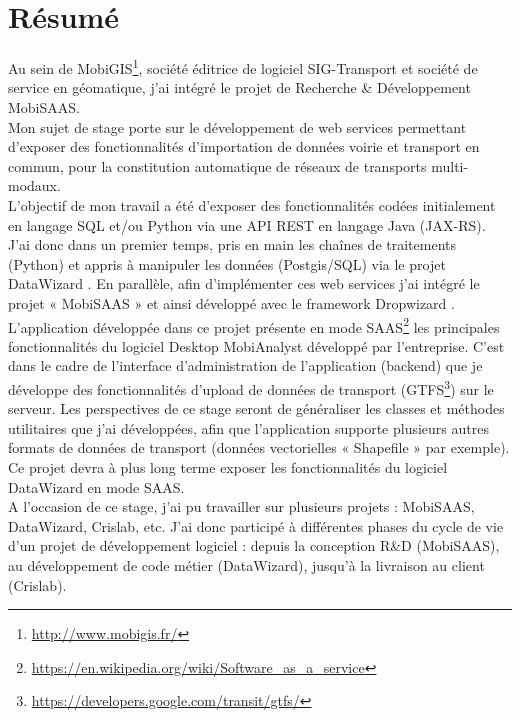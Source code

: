 \chapter*{Résumé}\label{Resume}

Au sein de MobiGIS\footnote{\url{http://www.mobigis.fr/}}, société éditrice de logiciel SIG-Transport et société de service en géomatique, j'ai intégré le projet de Recherche \& Développement \og MobiSAAS\fg.\\

Mon sujet de stage porte sur le développement de web services permettant d'exposer des fonctionnalités d'importation de données voirie et transport en commun, pour la constitution automatique de réseaux de transports multi-modaux. \\

L'objectif de mon travail a été d'exposer des fonctionnalités codées initialement en langage SQL et/ou Python via une API REST en langage Java (JAX-RS). J'ai donc dans un premier temps, pris en main les chaînes de traitements (Python) et appris à manipuler les données (Postgis/SQL) via le projet \og DataWizard \fg. En parallèle, afin d'implémenter ces web services j'ai intégré le projet « MobiSAAS » et ainsi développé avec le framework \og Dropwizard \fg. \\

L'application développée dans ce projet présente en mode SAAS\footnote{\url{https://en.wikipedia.org/wiki/Software_as_a_service}} les principales fonctionnalités du logiciel Desktop MobiAnalyst développé par l'entreprise. C'est dans le cadre de l'interface d'administration de l'application (backend) que je développe des fonctionnalités d'upload de données de transport (GTFS\footnote{\url{https://developers.google.com/transit/gtfs/}}) sur le serveur. Les perspectives de ce stage seront de généraliser les classes et méthodes utilitaires que j'ai développées, afin que l'application supporte plusieurs autres formats de données de transport (données vectorielles « Shapefile » par exemple). Ce projet devra à plus long terme exposer les fonctionnalités du logiciel DataWizard en mode SAAS.\\

A l'occasion de ce stage, j'ai pu travailler sur plusieurs projets : MobiSAAS, DataWizard, Crislab, etc. J'ai donc participé à différentes phases du cycle de vie d'un projet de développement logiciel : depuis la conception R\&D (MobiSAAS), au développement de code métier (DataWizard), jusqu'à la livraison au client (Crislab).\\